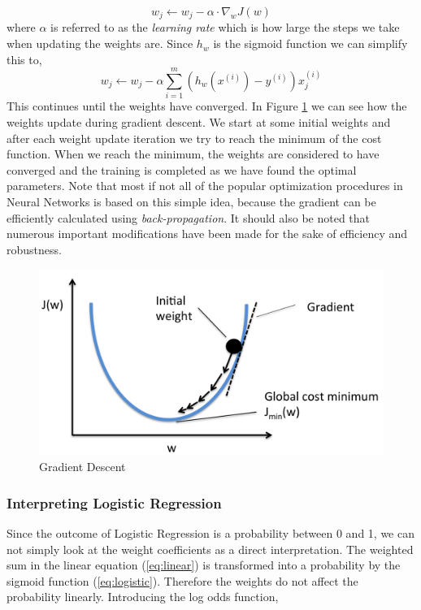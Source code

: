 \begin{equation}
w_{j} \longleftarrow w_{j} - \alpha \cdot \nabla_{w}J(w)
\end{equation}
where $\alpha$ is referred to as the \emph{learning rate} which is how large the steps we take when updating the weights are. Since $h_{w}$ is the sigmoid function we can simplify this to, 
\begin{equation}
    w_{j} \longleftarrow w_{j} - \alpha \sum_{i=1}^{m}(h_{w}(x^{(i)}) - y^{(i)})x_{j}^{(i)}
\end{equation}
This continues until the weights have converged.
In Figure \ref{fig-gradient-descent} we can see how the weights update during gradient descent. We start at some initial weights and after each weight update iteration we try to reach the minimum of the cost function. When we reach the minimum, the weights are considered to have converged and the training is completed as we have found the optimal parameters. Note that most if not all of the popular optimization procedures in Neural Networks is based on this simple idea, because the gradient can be efficiently calculated using \emph{back-propagation}. It should also be noted that numerous important modifications have been made for the sake of efficiency and robustness.
\begin {figure}[!htpb]
\centering
  \includegraphics[width=\linewidth]{Credit_Images/GradientDescent.png}
   \caption{Gradient Descent \cite{GradientDescent}}
    \label{fig-gradient-descent}
\end{figure}

\subsubsection{Interpreting Logistic Regression} \label{sect:interpreting-logistic-regression}
Since the outcome of Logistic Regression is a probability between 0 and 1, we can not simply look at the weight coefficients as a direct interpretation. The weighted sum in the linear equation (\ref{eq:linear}) is transformed into a probability by the sigmoid function (\ref{eq:logistic}). Therefore the weights do not affect the probability linearly. Introducing the log odds function,


